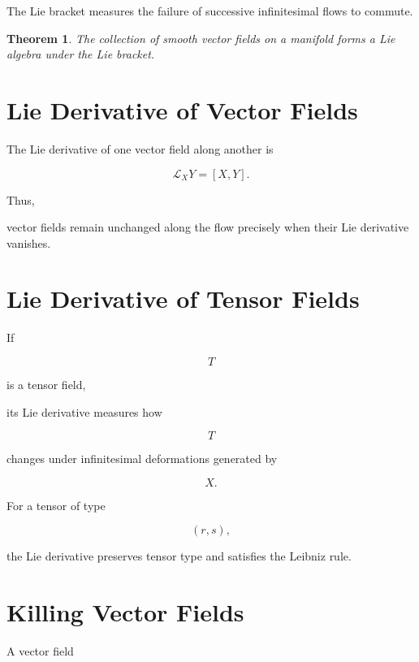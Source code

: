 \documentclass[11pt,fleqn]{book}
\numberwithin{equation}{chapter}
\theoremstyle{plain}
\newtheorem{theorem}{Theorem}[chapter]
\theoremstyle{definition}
\theoremstyle{remark}
\begin{document}
The Lie bracket measures the failure of successive infinitesimal flows
to commute.


\begin{theorem}

The collection of smooth vector fields on a manifold forms a Lie algebra
under the Lie bracket.

\end{theorem}


\section{Lie Derivative of Vector Fields}

The Lie derivative of one vector field along another is

\[
\boxed{
\mathcal L_XY
=
[X,Y].
}
\]

Thus,

vector fields remain unchanged along the flow precisely when their Lie
derivative vanishes.


\section{Lie Derivative of Tensor Fields}

If

\[
T
\]

is a tensor field,

its Lie derivative measures how

\[
T
\]

changes under infinitesimal deformations generated by

\[
X.
\]

For a tensor of type

\[
(r,s),
\]

the Lie derivative preserves tensor type and satisfies the Leibniz rule.


\section{Killing Vector Fields}

A vector field
\end{document}
